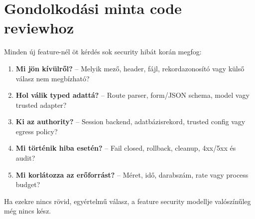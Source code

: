 \section{Gondolkodási minta code reviewhoz}

Minden új feature-nél öt kérdés sok security hibát korán megfog:

\begin{enumerate}
  \item \textbf{Mi jön kívülről?} -- Melyik mező, header, fájl, rekordazonosító vagy külső válasz nem megbízható?
  \item \textbf{Hol válik typed adattá?} -- Route parser, form/JSON schema, model vagy trusted adapter?
  \item \textbf{Ki az authority?} -- Session backend, adatbázisrekord, trusted config vagy egress policy?
  \item \textbf{Mi történik hiba esetén?} -- Fail closed, rollback, cleanup, 4xx/5xx és audit?
  \item \textbf{Mi korlátozza az erőforrást?} -- Méret, idő, darabszám, rate vagy process budget?
\end{enumerate}

Ha ezekre nincs rövid, egyértelmű válasz, a feature security modellje valószínűleg még nincs kész.
